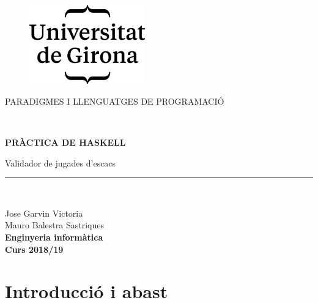 \documentclass[12pt]{article}
\begin{document}
\begin{titlepage}

\begin{center}
\vspace*{1in}
\begin{figure}[htb]
\begin{center}
\includegraphics[width=5cm]{logo}
\end{center}
\end{figure}

PARADIGMES I LLENGUATGES DE PROGRAMACIÓ
\vspace*{0.15in}
\vspace*{0.6in}
\begin{large}
\\
\end{large}
\vspace*{0.2in}
\begin{Large}
\textbf{PRÀCTICA DE HASKELL} \\
\end{Large}
\vspace*{0.2in}
\begin{large}
Validador de jugades d'escacs\\
\end{large}
\vspace*{0.2in}
\rule{80mm}{0.1mm}\\
\vspace*{0.2in}
\begin{large}
Jose Garvin Victoria \\
Mauro Balestra Sastriques \\
\vspace*{0.2in}
 \textbf{Enginyeria informàtica}\\
 \vspace*{0.2in}
 \textbf{Curs 2018/19}
\end{large}
\end{center}

\end{titlepage}



\newpage
\tableofcontents

\newpage
\section{Introducció i abast}
\end{document}
